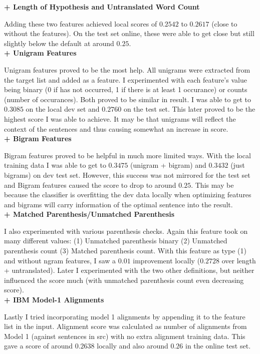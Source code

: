 \documentclass{article}
\begin{document}
{\bf + Length of Hypothesis and Untranslated Word Count}

Adding these two features achieved local scores of $0.2542$ to $0.2617$ (close to without the features). On the test set online, these were able to get close but still slightly below the default at around $0.25$.\\

{\bf + Unigram Features}

Unigram features proved to be the most help. All unigrams were extracted from the target list and added as a feature. I experimented with each feature's value being binary (0 if has not occurred, 1 if there is at least 1 occurance) or counts (number of occurances). Both proved to be similar in result. I was able to get to $0.3085$ on the local dev set and $0.2760$ on the test set. This later proved to be the highest score I was able to achieve. It may be that unigrams will reflect the context of the sentences and thus causing somewhat an increase in score. \\

{\bf + Bigram Features}

Bigram features proved to be helpful in much more limited ways. With the local training data I was able to get to $0.3475$ (unigram + bigram) and $0.3432$ (just bigrams) on dev test set. However, this success was not mirrored for the test set and Bigram features caused the score to drop to around $0.25$. This may be because the classifier is overfitting the dev data locally when optimizing features and bigrams will carry information of the optimal sentence into the result.\\

{\bf + Matched Parenthesis/Unmatched Parenthesis}

I also experimented with various parenthesis checks. Again this feature took on many different values: (1) Unmatched parenthesis binary (2) Unmatched parenthesis count (3) Matched parenthesis count. With this feature as type (1) and without ngram features, I saw a $0.01$ improvement locally ($0.2728$ over length + untranslated). Later I experimented with the two other definitions, but neither influenced the score much (with unmatched parenthesis count even decreasing score).\\

{\bf + IBM Model-1 Alignments}

Lastly I tried incorporating model 1 alignments by appending it to the feature list in the input. Alignment score was calculated as number of alignments from Model 1 (against sentences in src) with no extra alignment training data. This gave a score of around $0.2638$ locally and also around $0.26$ in the online test set. \\
\end{document}
